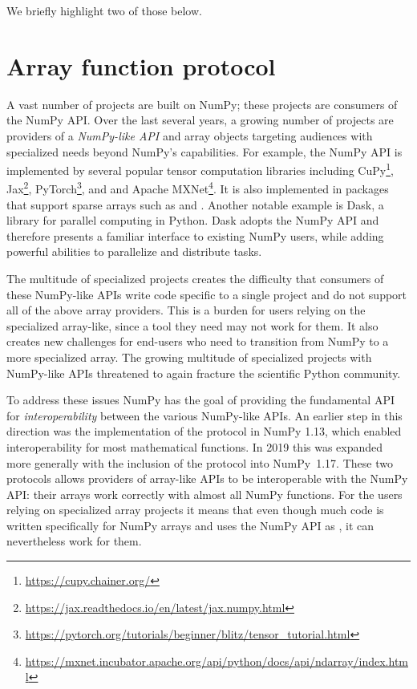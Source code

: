 We briefly highlight two of those below.

\section*{Array function protocol}

A vast number of projects are built on NumPy;
these projects are consumers of the NumPy API.
Over the last several years, a growing number of projects are providers of
a \emph{NumPy-like API} and array objects targeting audiences with specialized
needs beyond NumPy's capabilities.
For example, the NumPy API is implemented by several popular tensor computation
libraries including CuPy\footnote{\url{https://cupy.chainer.org/}},
Jax\footnote{\url{https://jax.readthedocs.io/en/latest/jax.numpy.html}},
PyTorch\footnote{\url{https://pytorch.org/tutorials/beginner/blitz/tensor\_tutorial.html}}, and
and Apache MXNet\footnote{\url{https://mxnet.incubator.apache.org/api/python/docs/api/ndarray/index.html}}.
It is also implemented in packages that support sparse arrays
such as  and .
Another notable example is Dask, a library for parallel computing in
Python.  Dask adopts the NumPy API and therefore presents a familiar
interface to existing NumPy users, while adding powerful abilities to
parallelize and distribute tasks.

The multitude of specialized projects creates the difficulty that consumers
of these NumPy-like APIs write code specific to a single project and do not support
all of the above array providers.
This is a burden for users relying on the specialized array-like, since
a tool they need may not work for them.
It also creates new challenges for end-users who need to transition
from NumPy to a more specialized array.
The growing multitude of specialized projects with NumPy-like APIs threatened
to again fracture the scientific Python community.

To address these issues NumPy has the goal of providing the fundamental
API for \emph{interoperability} between the various NumPy-like APIs.
An earlier step in this direction was the implementation of the
 protocol in NumPy 1.13, which enabled interoperability
for most mathematical functions.\cite{NEP13}
In 2019 this was expanded more generally with the inclusion of the
 protocol into NumPy~1.17.
These two protocols allows providers of array-like APIs to be interoperable
with the NumPy API: their arrays work correctly with almost all NumPy functions.\cite{NEP18}
For the users relying on specialized array projects it means that even though
much code is written specifically for NumPy arrays and uses the NumPy API as
, it can nevertheless work for them.
%
%

